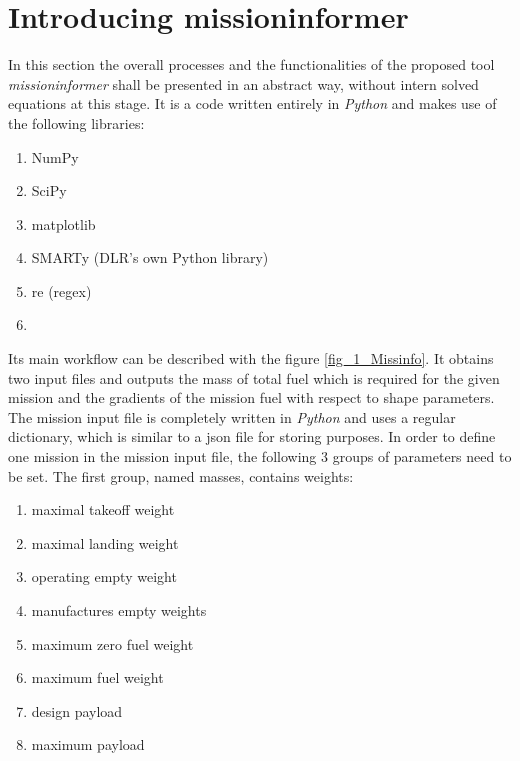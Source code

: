 
\section{Introducing missioninformer}
\label{sec_introduc_Miss}
In this section the overall processes and the functionalities 
of the proposed tool \emph{missioninformer} shall be presented 
in an abstract way, without intern solved equations at this stage.
It is a code written entirely in \emph{Python} and makes 
use of the following libraries:
\begin{multicols}{2}
    \begin{enumerate}
        \item NumPy \item SciPy  \item matplotlib
        \item SMARTy (DLR's own Python library)
        \item re (regex)
        \item[\vspace{\fill}]
    \end{enumerate}
\end{multicols}

Its main workflow can be described with the figure \ref{fig_1_Missinfo}. It 
obtains two input files and outputs the mass of total fuel which is required 
for the given mission and the gradients of the mission fuel with 
respect to shape parameters. 
The mission input file is completely written in \emph{Python} and uses a regular dictionary, 
which is similar to a json file for storing purposes. 
In order to define one mission in the mission input file, the 
following 3 groups of parameters need to be set. The first 
group, named masses, contains weights:
\begin{multicols}{2}
    \begin{enumerate}
        \item maximal takeoff weight
        \item maximal landing weight  
        \item operating empty weight
        \item manufactures empty weights
        \item maximum zero fuel weight
        \item maximum fuel weight
        \item design payload
        \item maximum payload
    \end{enumerate}
\end{multicols}

